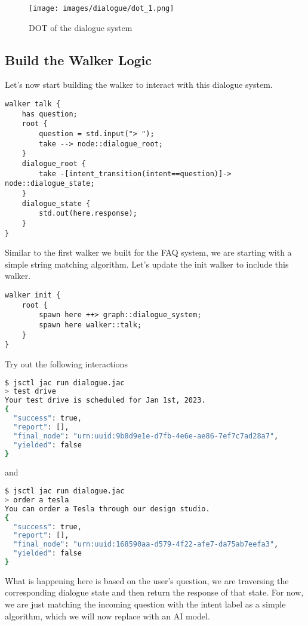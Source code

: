\begin{figure}
\centering
\texttt{[image: images/dialogue/dot\_1.png]}
\caption{DOT of the dialogue system}
\end{figure}

\hypertarget{build-the-walker-logic}{%
\subsection{Build the Walker Logic}\label{build-the-walker-logic}}

Let's now start building the walker to interact with this dialogue
system.

\begin{lstlisting}
walker talk {
    has question;
    root {
        question = std.input("> ");
        take --> node::dialogue_root;
    }
    dialogue_root {
        take -[intent_transition(intent==question)]-> node::dialogue_state;
    }
    dialogue_state {
        std.out(here.response);
    }
}
\end{lstlisting}

Similar to the first walker we built for the FAQ system, we are starting
with a simple string matching algorithm. Let's update the init walker to
include this walker.

\begin{lstlisting}
walker init {
    root {
        spawn here ++> graph::dialogue_system;
        spawn here walker::talk;
    }
}
\end{lstlisting}

Try out the following interactions

\begin{lstlisting}[language=bash]
$ jsctl jac run dialogue.jac
> test drive
Your test drive is scheduled for Jan 1st, 2023.
{
  "success": true,
  "report": [],
  "final_node": "urn:uuid:9b8d9e1e-d7fb-4e6e-ae86-7ef7c7ad28a7",
  "yielded": false
}
\end{lstlisting}

and

\begin{lstlisting}[language=bash]
$ jsctl jac run dialogue.jac
> order a tesla
You can order a Tesla through our design studio.
{
  "success": true,
  "report": [],
  "final_node": "urn:uuid:168590aa-d579-4f22-afe7-da75ab7eefa3",
  "yielded": false
}
\end{lstlisting}

What is happening here is based on the user's question, we are
traversing the corresponding dialogue state and then return the response
of that state. For now, we are just matching the incoming question with
the intent label as a simple algorithm, which we will now replace with
an AI model.


